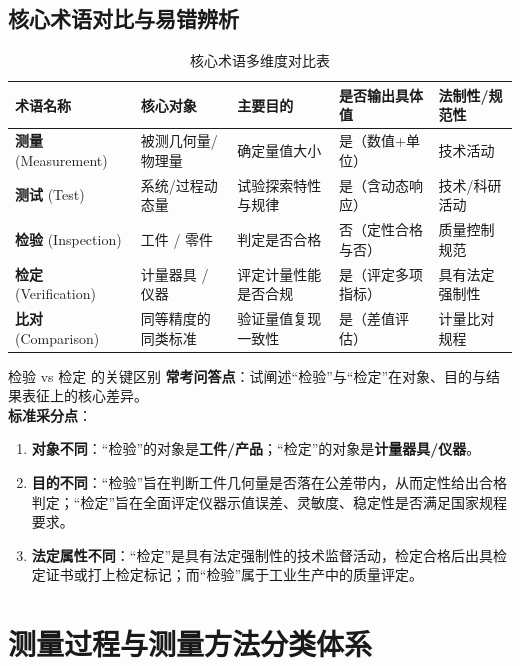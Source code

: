 \documentclass[11pt,a4paper]{ctexart}
\begin{document}
\subsection{核心术语对比与易错辨析}

\begin{table}[htbp]
\centering
\small
\caption{核心术语多维度对比表}
\label{tab:terminology_comparison}
\begin{tabularx}{\textwidth}{l p{3.2cm} p{3.2cm} p{3.2cm} X}
\toprule
\textbf{术语名称} & \textbf{核心对象} & \textbf{主要目的} & \textbf{是否输出具体值} & \textbf{法制性/规范性} \\
\midrule
\textbf{测量} (Measurement) & 被测几何量/物理量 & 确定量值大小 & 是（数值+单位） & 技术活动 \\
\textbf{测试} (Test) & 系统/过程动态量 & 试验探索特性与规律 & 是（含动态响应） & 技术/科研活动 \\
\textbf{检验} (Inspection) & 工件 / 零件 & 判定是否合格 & 否（定性合格与否） & 质量控制规范 \\
\textbf{检定} (Verification) & 计量器具 / 仪器 & 评定计量性能是否合规 & 是（评定多项指标） & 具有法定强制性 \\
\textbf{比对} (Comparison) & 同等精度的同类标准 & 验证量值复现一致性 & 是（差值评估） & 计量比对规程 \\
\bottomrule
\end{tabularx}
\end{table}

\begin{exambox}{检验 vs 检定 的关键区别}
\textbf{常考问答点}：试阐述“检验”与“检定”在对象、目的与结果表征上的核心差异。\\
\textbf{标准采分点}：
\begin{enumerate}[leftmargin=1.5em, itemsep=2pt]
    \item \textbf{对象不同}：“检验”的对象是\textbf{工件/产品}；“检定”的对象是\textbf{计量器具/仪器}。
    \item \textbf{目的不同}：“检验”旨在判断工件几何量是否落在公差带内，从而定性给出合格判定；“检定”旨在全面评定仪器示值误差、灵敏度、稳定性是否满足国家规程要求。
    \item \textbf{法定属性不同}：“检定”是具有法定强制性的技术监督活动，检定合格后出具检定证书或打上检定标记；而“检验”属于工业生产中的质量评定。
\end{enumerate}
\end{exambox}

\newpage
\section{测量过程与测量方法分类体系}
\end{document}
